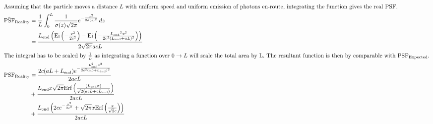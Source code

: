 \begin{align*}
 \intertext{Assuming that the particle moves a distance $L$ with uniform speed and uniform emission of photons en-route, integrating the function gives the real PSF.}
\hat{\text{PSF}}_{\text{Reality}} &= \frac{1}{L}\int_{0}^{L}\frac{1}{\sigma(z) \sqrt{2\pi}}e^{-\frac{x^2}{2 \sigma(z)^2}} \mathop{dz}\\
&= \frac{{L_{\text{end}}} \left(\text{Ei}\left(-\frac{x^2}{2 c^2}\right)-\text{Ei}\left(-\frac{{L_{\text{end}}}^2 x^2}{2 c^2 ({L_{\text{end}}}+a L)^2}\right)\right)}{2 \sqrt{2 \pi } a c L} \\
\intertext{The integral has to be scaled by $\frac{1}{L}$ as integrating a function over $0 \to L$ will scale the total area by L. The resultant function is then by comparable with $\text{PSF}_{\text{Expected}}$.}
{\text{PSF}}_{\text{Reality}} &= \frac{2 c (a L+L_{\text{end}}) e^{-\frac{L_{\text{end}}^2 x^2}{2 c^2 (a L+L_{\text{end}})^2}}}{2 a c L} \\
&+ \frac{L_{\text{end}} x\sqrt{2 \pi }\text{Erf}\left(\frac{ (L_{\text{end}} x)}{\sqrt{2} (a c L+c L_{\text{end}})}\right)}{2 a c L} \\
&+ \frac{L_{\text{end}} \left(2 c e^{-\frac{x^2}{2 c^2}}+\sqrt{2 \pi } x \text{Erf} \left(\frac{x}{\sqrt{2} c}\right)\right)}{2 a c L}
\end{align*}
